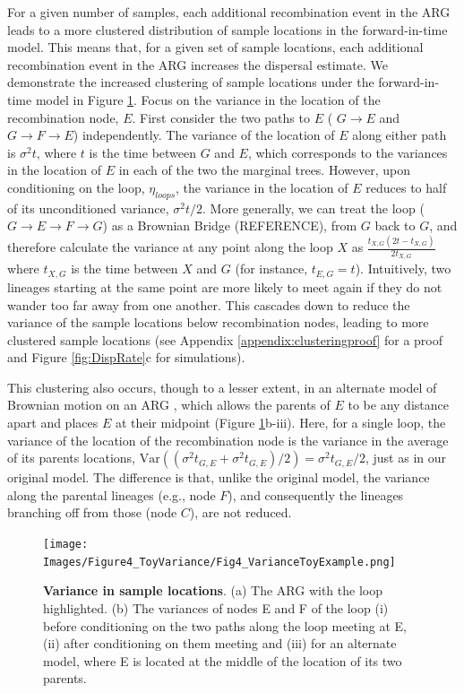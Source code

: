 For a given number of samples, each additional recombination event in the ARG leads to a more clustered distribution of sample locations in the forward-in-time model. This means that, for a given set of sample locations, each additional recombination event in the ARG increases the dispersal estimate. We demonstrate the increased clustering of sample locations under the forward-in-time model in Figure \ref{fig:VarToy}. Focus on the variance in the location of the recombination node, $E$. First consider the two paths to $E$ ( $G \rightarrow E$ and $G \rightarrow F \rightarrow E$) independently. The variance of the location of $E$ along either path is $\sigma^2t$, where $t$ is the time between $G$ and $E$, which corresponds to the variances in the location of $E$ in each of the two the marginal trees. However, upon conditioning on the loop, $\eta_{loops}$, the variance in the location of $E$ reduces to half of its unconditioned variance, $\sigma^2 t/2$. More generally, we can treat the loop ($G \rightarrow E \rightarrow F \rightarrow G$) as a Brownian Bridge (REFERENCE), from $G$ back to $G$, and therefore calculate the variance at any point along the loop $X$ as $\frac{t_{X,G} (2t - t_{X,G}) }{2 t_{X,G}}$ where $t_{X,G}$ is the time between $X$ and $G$ (for instance, $t_{E,G} = t$). Intuitively, two lineages starting at the same point are more likely to meet again if they do not wander too far away from one another. This cascades down to reduce the variance of the sample locations below recombination nodes, leading to more clustered sample locations (see Appendix \ref{appendix:clusteringproof} for a proof and Figure \ref{fig:DispRate}c for simulations). 

This clustering also occurs, though to a lesser extent, in an alternate model of Brownian motion on an ARG \citep{Bastide2018}, which allows the parents of $E$ to be any distance apart and places $E$ at their midpoint (Figure \ref{fig:VarToy}b-iii). Here, for a single loop, the variance of the location of the recombination node is the variance in the average of its parents locations, $\text{Var}((\sigma^2t_{G,E} + \sigma^2t_{G,E})/2) = \sigma^2t_{G,E}/2$, just as in our original model. The difference is that, unlike the original model, the variance along the parental lineages (e.g., node $F$), and consequently the lineages branching off from those (node $C$), are not reduced. 

\begin{figure}[hbtp]
    \centering
    \texttt{[image: Images/Figure4\_ToyVariance/Fig4\_VarianceToyExample.png]}
    \caption{\textbf{Variance in sample locations}. (a) The ARG with the loop highlighted. (b) The variances of nodes E and F of the loop (i) before conditioning on the two paths along the loop meeting at E, (ii) after conditioning on them meeting and (iii) for an alternate model, where E is located at the middle of the location of its two parents.   }
    \label{fig:VarToy}
\end{figure}


